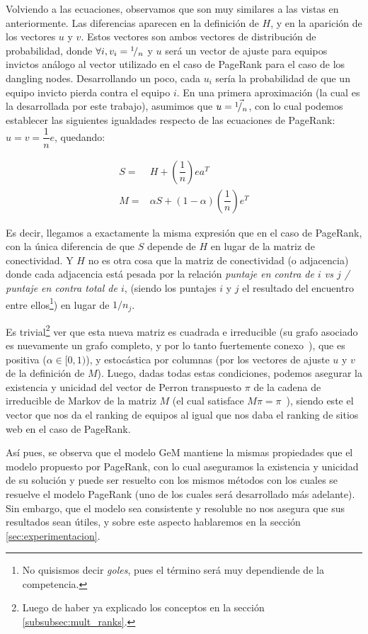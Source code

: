 \par Volviendo a las ecuaciones, observamos que son muy similares a las vistas
en anteriormente. Las diferencias aparecen en la definici\'on de $H$, y en la
aparici\'on de los vectores $u$ y $v$. Estos vectores son ambos vectores de
distribuci\'on de probabilidad, donde $\forall i, v_i = {}^{1}\!/_{n}$ y $u$
ser\'a un vector de ajuste para equipos invictos an\'alogo al vector utilizado
en el caso de PageRank para el caso de los dangling nodes. Desarrollando un
poco, cada $u_i$ ser\'ia la probabilidad de que un equipo invicto pierda contra
el equipo $i$. En una primera aproximaci\'on (la cual es la desarrollada por
este trabajo), asumimos que $u = \vec{{}^{1}\!/_{n}}$, con lo cual
podemos establecer las siguientes igualdades respecto de las ecuaciones de
PageRank: $u = v = \dfrac{1}{n}e$, quedando:

\begin{align}
    S =& H + \left(\dfrac{1}{n}\right)ea^T\\
    M =& \alpha S + (1-\alpha)\left(\dfrac{1}{n}\right)e^T\label{eq:M}
\end{align}

\par Es decir, llegamos a exactamente la misma expresi\'on que en el caso de
PageRank, con la \'unica diferencia de que $S$ depende de $H$ en lugar de la
matriz de conectividad. Y $H$ no es otra cosa que la matriz de conectividad (o
adjacencia) donde cada adjacencia est\'a pesada por la relaci\'on
\textit{puntaje en contra de $i$ vs $j$ / puntaje en contra total de $i$},
(siendo los puntajes $i$ y $j$ el resultado del encuentro entre ellos\footnote{No
quisismos decir \emph{goles}, pues el t\'ermino ser\'a muy dependiende de la
competencia.}) en lugar de $1/n_j$.

\par Es trivial\footnote{Luego de haber ya explicado los conceptos en la
secci\'on \ref{subsubsec:mult_ranks}.} ver que esta nueva matriz es cuadrada e
irreducible (su grafo asociado es nuevamente un grafo completo, y por lo tanto
fuertemente conexo~\cite[p.671]{Meyer2000}), que es positiva ($\alpha\in[0,1)$),
y estoc\'astica por columnas (por los vectores de ajuste $u$ y $v$ de la
definici\'on de $M$). Luego, dadas todas estas condiciones, podemos asegurar la
existencia y unicidad del vector de Perron transpuesto $\pi$ de la cadena de
irreducible de Markov de la matriz $M$ (el cual satisface
$M\pi=\pi$~\cite[p.693]{Meyer2000}), siendo este el vector que nos da el ranking
de equipos al igual que nos daba el ranking de sitios web en el caso de
PageRank.

\par As\'i pues, se observa que el modelo GeM mantiene la mismas propiedades que
el modelo propuesto por PageRank, con lo cual aseguramos la existencia y
unicidad de su soluci\'on y puede ser resuelto con los mismos m\'etodos con los
cuales se resuelve el modelo PageRank (uno de los cuales ser\'a desarrollado
m\'as adelante). Sin embargo, que el modelo sea consistente y resoluble no nos
asegura que sus resultados sean \'utiles, y sobre este aspecto hablaremos en la
secci\'on \ref{sec:experimentacion}.

